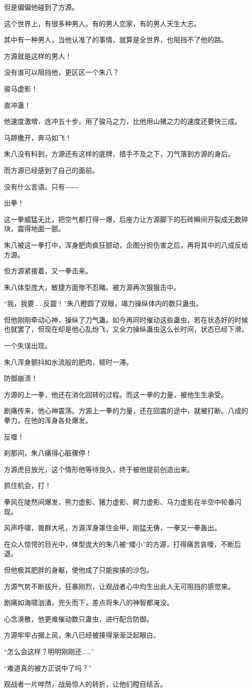 \begin{this_body}
但是偏偏他碰到了方源。

这个世界上，有很多种男人。有的男人恋家，有的男人天生大志。

其中有一种男人，当他认准了的事情，就算是全世界，也阻挡不了他的路。

方源就是这样的男人！

没有谁可以阻挡他，更区区一个朱八？

骏马虚影！

直冲蛊！

他速度激增，连冲五十步。用了骏马之力，比他用山猪之力的速度还要快三成。

马蹄撒开，奔马如飞！

朱八没有料到，方源还有这样的底牌，措手不及之下，刀气落到方源的身后。

而方源已经感到了自己的面前。

没有什么言语。只有――

出拳！

这一拳威猛无比，把空气都打得一爆，后座力让方源脚下的石砖瞬间开裂成无数碎块，震得地面一颤。

朱八被这一拳打中，浑身肥肉疯狂颤动，企图分担伤害之后，再将其中的八成反给方源。

但方源紧接着，又一拳击来。

朱八体型庞大，敏捷方面惨不忍睹。被方源再次狠狠击中。

“我，我要……反震！”朱八瞪圆了双眼，竭力操纵体内的数只蛊虫。

但他刚刚牵动心神，操纵了刀气蛊。如今再同时催动这些蛊虫，若在状态好的时候也就罢了，但现在却是他心乱纷飞，又全力操纵蛊虫这么长时间，状态已经下滑。

一个失误出现。

朱八浑身颤抖如水流般的肥肉，顿时一滞。

防御崩溃！

方源的上一拳，他还在消化回转的过程。而这一拳的力量，被他生生承受。

剧痛传来，他心神震荡。方源上一拳的力量，还在回震的途中，就被打断。八成的拳力，在他的浑身各处爆发。

反噬！

刹那间，朱八痛得心脏骤停！

方源虎目放光，这个情形他等待良久，终于被他提前创造出来。

抓住机会，打！

拳风在陡然间爆发，熊力虚影、猪力虚影、鳄力虚影、马力虚影在半空中轮番闪现。

风声呼啸，兽群大吼，方源浑身罩住金甲，刚猛无俦，一拳又一拳轰出。

在众人惊愕的目光中，体型庞大的朱八被“矮小”的方源，打得痛苦哀嚎，不断后退。

但他极其肥胖的身躯，使他成了只能挨揍的沙包。

方源气势不断拔升，狂暴刚烈，让观战者心中均生出此人无可阻挡的感觉来。

剧痛如海啸汹涌，兜头而下，差点将朱八的神智都淹没。

心念涣散，他更难催动数只蛊虫，进行配合防御。

方源牢牢占据上风，朱八已经被揍得渐渐泛起眼白。

“怎么会这样？明明刚刚还……”

“难道真的被方正说中了吗？”

观战者一片哗然，战局惊人的转折，让他们瞠目结舌。

\end{this_body}


